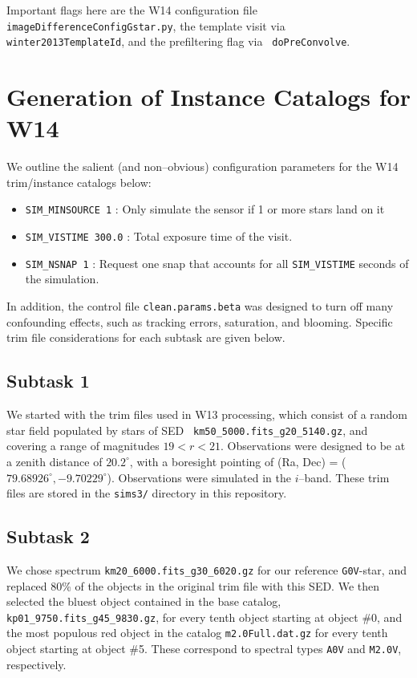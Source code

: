 \documentclass[prd, nofootinbib, floatfix, 11pt, tightenlines, times]{article}
\begin{document}
\begin{appendices}
Important flags here are the W14 configuration file {\tt
  imageDifferenceConfigGstar.py}, the template visit via {\tt
  winter2013TemplateId}, and the prefiltering flag via {\tt
  doPreConvolve}.

\section{Generation of Instance Catalogs for W14 \label{appx:tasks}}

We outline the salient (and non--obvious) configuration parameters for
the W14 trim/instance catalogs below:
\begin{itemize}
  \item {\tt SIM\_MINSOURCE 1} : Only simulate the sensor if 1 or more
    stars land on it
  \item {\tt SIM\_VISTIME 300.0} : Total exposure time of the visit.
  \item {\tt SIM\_NSNAP 1} : Request one snap that accounts for all
    {\tt SIM\_VISTIME} seconds of the simulation.
\end{itemize}

In addition, the control file {\tt clean.params.beta} was designed to
turn off many confounding effects, such as tracking errors,
saturation, and blooming.  Specific trim file considerations for each
subtask are given below.

\subsection{Subtask 1}

We started with the trim files used in W13 processing, which consist
of a random star field populated by stars of SED {\tt
  km50\_5000.fits\_g20\_5140.gz}, and covering a range of magnitudes
$19 < r < 21$.  Observations were designed to be at a zenith distance
of $20.2^{\circ}$, with a boresight pointing of (Ra, Dec) =
($79.68926^{\circ}, -9.70229^{\circ}$).  Observations were simulated
in the $i$--band.  These trim files are stored in the {\tt sims3/}
directory in this repository.

\subsection{Subtask 2}

We chose spectrum {\tt km20\_6000.fits\_g30\_6020.gz} for our
reference {\tt G0V}-star, and replaced 80\% of the objects in the
original trim file with this SED.  We then selected the bluest object
contained in the base catalog, {\tt kp01\_9750.fits\_g45\_9830.gz},
for every tenth object starting at object \#0, and the most populous
red object in the catalog {\tt m2.0Full.dat.gz} for every tenth object
starting at object \#5.  These correspond to spectral types {\tt A0V}
and {\tt M2.0V}, respectively.  


\end{appendices}
\end{document}
